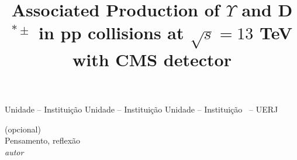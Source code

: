 \documentclass[a4paper,12pt,oneside,onecolumn,final,fleqn]{repUERJ}
\title{Associated Production of $\Upsilon$ and D$^{*\pm}$ in pp collisions at $\sqrt{s} = 13$ TeV with CMS detector}
\begin{document}

\frontmatter %

%
\capa
\folhaderosto
%
%
%
\fichacatalografica{}
%
%
\begin{folhadeaprovacao}
             {Unidade -- Instituição}
             {Unidade -- Instituição}
             {Unidade -- Instituição}
             {\UERJunidade \UERJunidadenome\ -- UERJ}
\end{folhadeaprovacao}
%
%

%
%

%
%
\pretextualchapter{}
\vfill
\begin{flushright}
(opcional)\\
Pensamento, reflexão\\    
\textit{autor}
\end{flushright}
%
\end{document}
